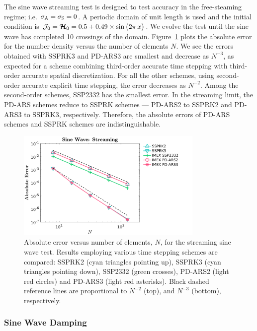 The sine wave streaming test is designed to test accuracy in the free-steaming regime; i.e. $\sigma_{{\rm A}} = \sigma_{{\rm S}} = 0$.
A periodic domain of unit length is used and the initial condition is $\mathcal{J}_{0} = \boldsymbol{\mathcal{H}}_{0} = 0.5+0.49\times\sin\big(2\pi\,x\big)$.
We evolve the test until the sine wave has completed 10 crossings of the domain.
Figure~\ref{fig: SineWaveStreaming} plots the absolute error for the number density versus the number of elements $N$.
We see the errors obtained with SSPRK3 and PD-ARS3 are smallest and decrease as $N^{-3}$, as expected for a scheme combining third-order accurate time stepping with third-order accurate spatial discretization.
For all the other schemes, using second-order accurate explicit time stepping, the error decreases as $N^{-2}$.
Among the second-order schemes, SSP2332 has the smallest error.
In the streaming limit, the PD-ARS schemes reduce to SSPRK schemes --- PD-ARS2 to SSPRK2 and PD-ARS3 to SSPRK3, respectively.
Therefore, the absolute errors of PD-ARS schemes and SSPRK schemes are indistinguishable.  

\begin{figure}[h]
  \centering
    \includegraphics[width=0.8\textwidth]{figures/SineWaveStreaming}
   \caption{Absolute error versus number of elements, $N$, for the streaming sine wave test.  Results employing various time stepping schemes are compared: SSPRK2 (cyan triangles pointing up), SSPRK3 (cyan triangles pointing down), SSP2332 (green crosses), PD-ARS2 (light red circles) and PD-ARS3 (light red asterisks). Black dashed reference lines are proportional to $N^{-2}$ (top), and $N^{-3}$ (bottom), respectively.}
   \label{fig: SineWaveStreaming}
\end{figure}

\subsubsection{Sine Wave Damping}

